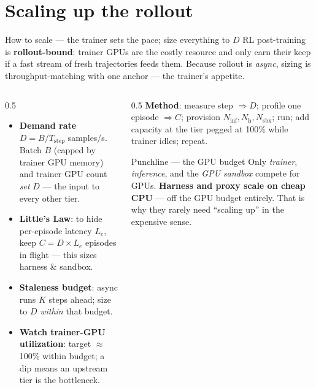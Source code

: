 \documentclass[aspectratio=169]{beamer}
\begin{document}
\section{Scaling up the rollout}

\begin{frame}{How to scale --- the trainer sets the pace; size everything to $D$}
  \footnotesize RL post-training is \textbf{rollout-bound}: trainer GPUs are the costly resource and
  only earn their keep if a fast stream of fresh trajectories feeds them. Because rollout is
  \emph{async}, sizing is throughput-matching with one anchor --- the trainer's appetite.
  \begin{columns}[T]
    \begin{column}{0.5\textwidth}
      \begin{itemize}\setlength\itemsep{0.15em}
        \item \textbf{Demand rate} $D = B / T_{\text{step}}$ samples/s. Batch $B$ (capped by trainer
          GPU memory) and trainer GPU count \emph{set} $D$ --- the input to every other tier.
        \item \textbf{Little's Law}: to hide per-episode latency $L_e$, keep $C = D\times L_e$ episodes
          in flight --- this sizes harness \& sandbox.
        \item \textbf{Staleness budget}: async runs $K$ steps ahead; size to $D$ \emph{within} that budget.
        \item \textbf{Watch trainer-GPU utilization}: target $\approx$100\% within budget; a dip means
          an upstream tier is the bottleneck.
      \end{itemize}
    \end{column}
    \begin{column}{0.5\textwidth}
      \textbf{Method}: measure step $\Rightarrow D$; profile one episode $\Rightarrow C$; provision
      $N_{\text{inf}}, N_{\text{h}}, N_{\text{sbx}}$; run; add capacity at the tier pegged at 100\%
      while trainer idles; repeat.
      \vspace{0.3em}
      \begin{block}{Punchline --- the GPU budget}
        \scriptsize Only \emph{trainer}, \emph{inference}, and the \emph{GPU sandbox} compete for
        GPUs. \textbf{Harness and proxy scale on cheap CPU} --- off the GPU budget entirely. That is why
        they rarely need ``scaling up'' in the expensive sense.
      \end{block}
    \end{column}
  \end{columns}
\end{frame}
\end{document}
